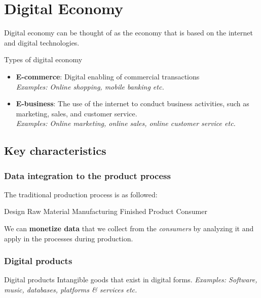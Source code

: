 
\section{Digital Economy}

Digital economy can be thought of as the economy that is based on the internet and digital technologies.

\begin{definition}
    {Types of digital economy}
    \begin{itemize}
        \item \textbf{E-commerce}: Digital enabling of commercial transactions
              \\      \textit{Examples: Online shopping, mobile banking etc.}
        \item \textbf{E-business}: The use of the internet to conduct business activities, such as marketing, sales, and customer service.
              \\      \textit{Examples: Online marketing, online sales, online customer service etc.}
    \end{itemize}
\end{definition}

\subsection{Key characteristics}

\subsubsection{Data integration to the product process}

The traditional production process is as followed:

Design\quad\rightarrowfill\quad
Raw Material\quad\rightarrowfill\quad
Manufacturing\quad\rightarrowfill\quad
Finished Product\quad\rightarrowfill\quad
Consumer

We can \textbf{monetize data} that we collect from the \textit{consumers} by analyzing it and apply in the processes during production.

\subsubsection{Digital products}

\begin{definition}
    {Digital products}
    Intangible goods that exist in digital forms. \textit{Examples: Software, music, databases, platforms \& services etc.}
\end{definition}

